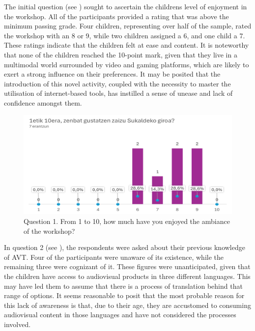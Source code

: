 The initial question (see ) sought to ascertain the
children\textquotesingle s level of enjoyment in the workshop. All of
the participants provided a rating that was above the minimum passing
grade. Four children, representing over half of the sample, rated the
workshop with an 8 or 9, while two children assigned a 6, and one child
a 7. These ratings indicate that the children felt at ease and content.
It is noteworthy that none of the children reached the 10-point mark,
given that they live in a multimodal world surrounded by video and
gaming platforms, which are likely to exert a strong influence on their
preferences. It may be posited that the introduction of this novel
activity, coupled with the necessity to master the utilisation of
internet-based tools, has instilled a sense of unease and lack of
confidence amongst them.
\begin{figure}[!htbp]
    \centering
    \begin{minipage}{.75\textwidth}
    \includegraphics[width=\textwidth]{fig01.png}
    \caption{Question 1. From 1 to 10, how much have you enjoyed
    the ambiance of the workshop?}
    \label{fig-01}
    \end{minipage}
\end{figure}

In question 2 (see ), the respondents were asked about their
previous knowledge of AVT. Four of the participants were unaware of its
existence, while the remaining three were cognizant of it. These figures
were unanticipated, given that the children have access to audiovisual
products in three different languages. This may have led them to assume
that there is a process of translation behind that range of options. It
seems reasonable to posit that the most probable reason for this lack of
awareness is that, due to their age, they are accustomed to consuming
audiovisual content in those languages and have not considered the
processes involved.

